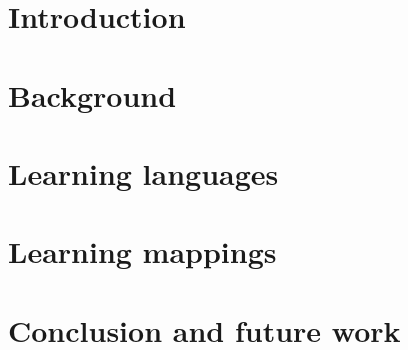 \documentclass[12pt]{report}
\theoremstyle{mystyle}
\begin{document}




\newpage



\newpage



\tableofcontents
\newpage

\listoffigures
\newpage

\listoftables
\newpage



\chapter{Introduction}


\chapter{Background}


\chapter{Learning languages}

\chapter{Learning mappings}

\chapter{Conclusion and future work}


\appendix


\footnotesize %


\end{document}
